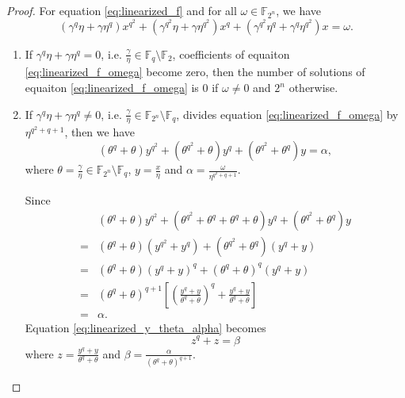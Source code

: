 \documentclass[12 pt]{article}
\def\F{{\mathbb F}}
\begin{document}
{\begin{proof}
  For equation \eqref{eq:linearized_f} and for all $ \omega\in\F_{2^n} $, we have 
  \begin{equation}\label{eq:linearized_f_omega}
    \left( \gamma^q\eta+\gamma\eta^q \right)x^{q^2}+\left( \gamma^{q^2}\eta+\gamma\eta^{q^2} \right)x^q+\left( \gamma^{q^2}\eta^q+\gamma^q\eta^{q^2} \right)x = \omega.
  \end{equation}
  \begin{enumerate}[label=(\arabic{*})]
    \item If $ \gamma^q\eta+\gamma\eta^q=0 $, i.e. $ \frac{\gamma}{\eta}\in\F_q\setminus\F_2 $, 
    coefficients of equaiton \eqref{eq:linearized_f_omega} become zero, then the number of solutions of equaiton \eqref{eq:linearized_f_omega} 
    is $ 0 $ if $ \omega\ne 0 $ and $ 2^n $ otherwise.
    \item If $ \gamma^q\eta+\gamma\eta^q\ne 0 $, i.e. $ \frac{\gamma}{\eta}\in\F_{2^n}\setminus\F_q $, 
    divides equation \eqref{eq:linearized_f_omega} by $ \eta^{q^2+q+1} $, then we have 
    \begin{equation}\label{eq:linearized_y_theta_alpha}
      \left( \theta^q+\theta \right)y^{q^2}+\left( \theta^{q^2}+\theta \right)y^q+\left( \theta^{q^2}+\theta^q \right)y = \alpha,
    \end{equation}
    where $ \theta=\frac{\gamma}{\eta}\in\F_{2^n}\setminus\F_q $, 
    $ y=\frac{x}{\eta} $ and $ \alpha=\frac{\omega}{\eta^{q^2+q+1}} $.

    Since 
    \begin{align*}
      &\left( \theta^q+\theta \right)y^{q^2}+\left( \theta^{q^2}+\theta^q+\theta^q+\theta \right)y^q+\left( \theta^{q^2}+\theta^q \right)y\\ 
      =& \left( \theta^q+\theta \right)(y^{q^2}+y^q)+\left( \theta^{q^2}+\theta^q \right)(y^q+y)\\
      =& \left( \theta^q+\theta \right)(y^{q}+y)^q+\left( \theta^{q}+\theta \right)^q(y^q+y)\\
      =& \left( \theta^q+\theta \right)^{q+1}\left[ \left(\frac{y^{q}+y}{\theta^q+\theta}\right)^q+\frac{y^q+y}{\theta^q+\theta} \right]\\
      =&\alpha.
    \end{align*}
    Equation \eqref{eq:linearized_y_theta_alpha} becomes 
    \begin{equation}\label{eq:dontnkwb}
      z^q+z=\beta
    \end{equation}
    where $ z=\frac{y^q+y}{\theta^q+\theta} $ and $ \beta=\frac{\alpha}{\left( \theta^q+\theta \right)^{q+1}} $.


\end{enumerate}
\end{proof}}
\end{document}
